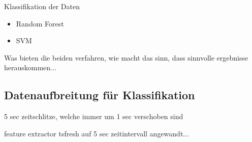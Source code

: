 Klassifikation der Daten
\begin{itemize}
    \item Random Forest
    \item SVM
\end{itemize}

Was bieten die beiden verfahren, wie macht das sinn, dass sinnvolle ergebnisse herauskommen...

\subsection{Datenaufbreitung für Klassifikation}
\label{ch:sa:machine_learning:data_handling}

5 sec zeitschlitze, welche immer um 1 sec verschoben sind

feature extractor tsfresh auf 5 sec zeitintervall angewandt...
